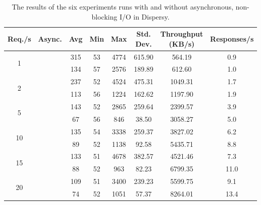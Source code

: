 \begin{table}[!h]
	\centering
	\caption{The results of the six experiments runs with and without asynchronous, non-blocking I/O in Dispersy.}
	\label{table:responsiveness_tribler_load}
	\begin{tabular}{|c|c|c|c|c|c|c|c|}
		\hline
		Req./s              & Async. & Avg & Min & Max  & Std. Dev. & Throughput (KB/s) & Responses/s \\ \hline
		\multirow{2}{*}{1}  & \xmark      & 315 & 53  & 4774 & 615.90    & 564.19            & 0.9         \\ \cline{2-8} 
		& \cmark      & 134 & 57  & 2576 & 189.89    & 612.60            & 1.0         \\ \hline
		\multirow{2}{*}{2}  & \xmark       & 237 & 52  & 4524 & 475.31    & 1049.31           & 1.7         \\ \cline{2-8} 
		& \cmark      & 113 & 56  & 1224 & 162.62    & 1197.90           & 1.9         \\ \hline
		\multirow{2}{*}{5}  & \xmark       & 143 & 52  & 2865 & 259.64    & 2399.57           & 3.9         \\ \cline{2-8} 
		& \cmark      & 67  & 56  & 846  & 38.50     & 3058.27           & 5.0         \\ \hline
		\multirow{2}{*}{10} & \xmark       & 135 & 54  & 3338 & 259.37    & 3827.02           & 6.2         \\ \cline{2-8} 
		& \cmark      & 89  & 52  & 1138 & 92.58     & 5435.71           & 8.8         \\ \hline
		\multirow{2}{*}{15} & \xmark       & 133 & 51  & 4678 & 382.57    & 4521.46           & 7.3         \\ \cline{2-8} 
		& \cmark      & 88  & 52  & 963  & 82.23     & 6799.35           & 11.0        \\ \hline
		\multirow{2}{*}{20} & \xmark       & 109 & 51  & 3400 & 239.23    & 5599.75           & 9.1         \\ \cline{2-8} 
		& \cmark      & 74  & 52  & 1051 & 57.37     & 8264.01           & 13.4        \\ \hline
	\end{tabular}
\end{table}

